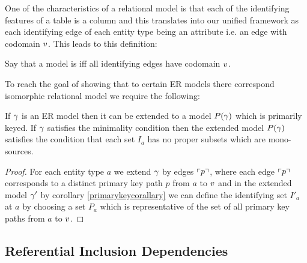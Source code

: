 One of the characteristics of a relational model is that each of the identifying features of a table is a column
and this translates into our unified framework as each identifying edge of each entity type being an attribute i.e. 
an edge with codomain $v$. This leads to this definition: 
\begin{definition}
Say that a model is  iff all identifying edges 
have codomain $v$.
\end{definition}
To reach the goal of showing that to certain ER models there correspond isomorphic relational model we require the following:
\begin{lemma}
If $\gamma$ is an ER model then it can be extended to a model $P(\gamma)$
which is primarily keyed. If $\gamma$ satisfies the minimality condition then the
extended model $P(\gamma)$ satisfies the  condition that each set $I_a$ has no proper subsets which are mono-sources. 
\end{lemma}
\begin{proof}
For each entity type $a$ we extend $\gamma$ by edges $\left\ulcorner p\right\urcorner$, where each edge 
$\left\ulcorner p\right\urcorner$ corresponds to a distinct primary key path $p$ from $a$ to $v$
and in the extended model $\gamma'$ by corollary \ref{primarykeycorallary} 
we can define the identifying set $I'_a$ at $a$ by choosing a set $P_a$ which is representative of the set of all primary key paths from $a$ to $v$.
\end{proof}

\subsection{Referential Inclusion Dependencies}

